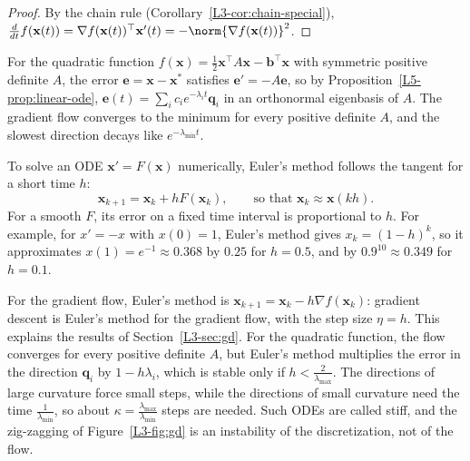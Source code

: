 \begin{proof}
    By the chain rule (Corollary~\ref{L3-cor:chain-special}), $\frac{d}{dt}f(\mathbf{x}(t)) = \nabla f(\mathbf{x}(t))^\top\mathbf{x}'(t) = -\norm{\nabla f(\mathbf{x}(t))}^2$.
\end{proof}

For the quadratic function $f(\mathbf{x}) = \frac{1}{2}\mathbf{x}^\top A\mathbf{x} - \mathbf{b}^\top\mathbf{x}$ with symmetric positive definite $A$, the error $\mathbf{e} = \mathbf{x} - \mathbf{x}^*$ satisfies $\mathbf{e}' = -A\mathbf{e}$, so by Proposition~\ref{L5-prop:linear-ode}, $\mathbf{e}(t) = \sum_i c_ie^{-\lambda_i t}\mathbf{q}_i$ in an orthonormal eigenbasis of $A$. The gradient flow converges to the minimum for every positive definite $A$, and the slowest direction decays like $e^{-\lambda_{\min}t}$.

To solve an ODE $\mathbf{x}' = F(\mathbf{x})$ numerically, Euler's method follows the tangent for a short time $h$:
\[\mathbf{x}_{k+1} = \mathbf{x}_k + hF(\mathbf{x}_k), \qquad \text{so that } \mathbf{x}_k \approx \mathbf{x}(kh).\]
For a smooth $F$, its error on a fixed time interval is proportional to $h$. For example, for $x' = -x$ with $x(0) = 1$, Euler's method gives $x_k = (1 - h)^k$, so it approximates $x(1) = e^{-1} \approx 0.368$ by $0.25$ for $h = 0.5$, and by $0.9^{10} \approx 0.349$ for $h = 0.1$.

For the gradient flow, Euler's method is $\mathbf{x}_{k+1} = \mathbf{x}_k - h\nabla f(\mathbf{x}_k)$: gradient descent is Euler's method for the gradient flow, with the step size $\eta = h$. This explains the results of Section~\ref{L3-sec:gd}. For the quadratic function, the flow converges for every positive definite $A$, but Euler's method multiplies the error in the direction $\mathbf{q}_i$ by $1 - h\lambda_i$, which is stable only if $h < \frac{2}{\lambda_{\max}}$. The directions of large curvature force small steps, while the directions of small curvature need the time $\frac{1}{\lambda_{\min}}$, so about $\kappa = \frac{\lambda_{\max}}{\lambda_{\min}}$ steps are needed. Such ODEs are called stiff, and the zig-zagging of Figure~\ref{L3-fig:gd} is an instability of the discretization, not of the flow.

